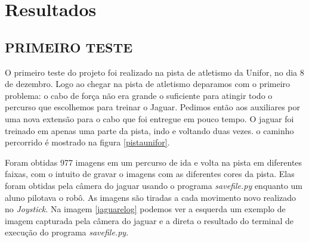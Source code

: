 \chapter{Resultados}

\section{PRIMEIRO TESTE}
\label{primeiro_teste}
O primeiro teste do projeto foi realizado na pista de atletismo da Unifor, no dia 8 de dezembro.
Logo ao chegar na pista de atletismo deparamos com o primeiro problema: o cabo de força não era grande o suficiente para atingir todo o percurso que escolhemos para treinar o Jaguar. Pedimos então aos auxiliares por uma nova extensão para o cabo que foi entregue em pouco tempo. O jaguar foi treinado em apenas uma parte da pista, indo e voltando duas vezes. o caminho percorrido é mostrado na figura \ref{pistaunifor}.

	\begin{figure}[H]
		\centering
\end{figure}

Foram obtidas 977 imagens em um percurso de ida e volta na pista em diferentes faixas, com o intuito de gravar o imagens com as diferentes cores da pista. Elas foram obtidas pela câmera do jaguar usando o programa \textit{savefile.py} enquanto um aluno pilotava o robô. As imagens são tiradas a cada movimento novo realizado no \textit{Joystick}. Na imagem \ref{jaguarelog} podemos ver a esquerda um exemplo de imagem capturada pela câmera do jaguar e a direta o resultado do terminal de execução do programa \textit{savefile.py}.

